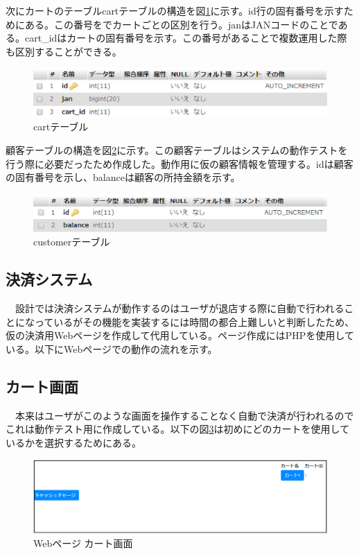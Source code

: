 \newpage

次にカートのテーブルcartテーブルの構造を図\ref{cart_db}に示す。id行の固有番号を示すためにある。この番号をでカートごとの区別を行う。janはJANコードのことである。cart\_idはカートの固有番号を示す。この番号があることで複数運用した際も区別することができる。
\begin{figure}[htbp]
\centering
\includegraphics[width=15cm]{./pic/cart_db.eps}
\caption{cartテーブル}
\label{cart_db}
\end{figure}


顧客テーブルの構造を図\ref{customer_db}に示す。この顧客テーブルはシステムの動作テストを行う際に必要だったため作成した。動作用に仮の顧客情報を管理する。idは顧客の固有番号を示し、balanceは顧客の所持金額を示す。

\begin{figure}[htbp]
\centering
\includegraphics[width=15cm]{./pic/customer.eps}
\caption{customerテーブル}
\label{customer_db}
\end{figure}

\newpage

\subsection*{決済システム}
　設計では決済システムが動作するのはユーザが退店する際に自動で行われることになっているがその機能を実装するには時間の都合上難しいと判断したため、仮の決済用Webページを作成して代用している。ページ作成にはPHPを使用している。以下にWebページでの動作の流れを示す。

\subsection*{カート画面}
　本来はユーザがこのような画面を操作することなく自動で決済が行われるのでこれは動作テスト用に作成している。以下の図\ref{web_cart}は初めにどのカートを使用しているかを選択するためにある。
\begin{figure}[htbp]
\centering
\includegraphics[width=15cm]{./pic/web/1.eps}
\caption{Webページ カート画面}
\label{web_cart}
\end{figure}

